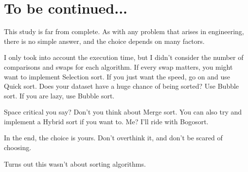 \documentclass[11pt, a4paper]{article}
\begin{document}
\section{To be continued...}
This study is far from complete. As with any problem that arises in engineering, there is no simple answer, and the choice depends on many factors.

I only took into account the execution time, but I didn't consider the number of comparisons and swaps for each algorithm. If every swap matters, you might want to implement Selection sort. If you just want the speed, go on and use Quick sort. Does your dataset have a huge chance of being sorted? Use Bubble sort. If you are lazy, use Bubble sort.

Space critical you say? Don't you think about Merge sort. You can also try and implement a Hybrid sort if you want to. Me? I'll ride with Bogosort.

In the end, the choice is yours. Don't overthink it, and don't be scared of choosing.

Turns out this wasn't about sorting algorithms.
\end{document}
